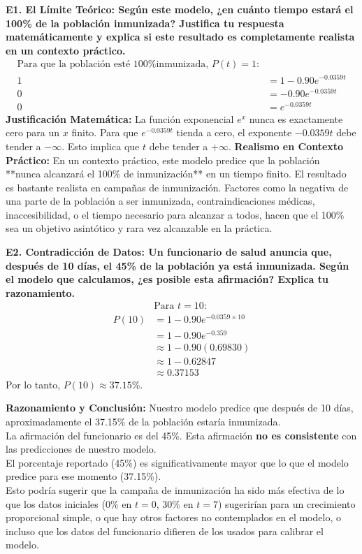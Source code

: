 \documentclass[12pt, a4paper]{article}
\begin{document}
\vspace{0.5em}
\noindent \textbf{E1. El Límite Teórico: Según este modelo, ¿en cuánto tiempo estará el 100\% de la población inmunizada? Justifica tu respuesta matemáticamente y explica si este resultado es completamente realista en un contexto práctico.}
\begin{align*}
\text{Para que la población esté 100\% inmunizada, } P(t) = 1\text{:} \\
1 &= 1 - 0.90e^{-0.0359t} \\
0 &= -0.90e^{-0.0359t} \\
0 &= e^{-0.0359t}
\end{align*}
\textbf{Justificación Matemática:} La función exponencial $e^x$ nunca es exactamente cero para un $x$ finito. Para que $e^{-0.0359t}$ tienda a cero, el exponente $-0.0359t$ debe tender a $-\infty$. Esto implica que $t$ debe tender a $+\infty$.
\textbf{Realismo en Contexto Práctico:} En un contexto práctico, este modelo predice que la población **nunca alcanzará el 100\% de inmunización** en un tiempo finito. El resultado es bastante realista en campañas de inmunización. Factores como la negativa de una parte de la población a ser inmunizada, contraindicaciones médicas, inaccesibilidad, o el tiempo necesario para alcanzar a todos, hacen que el 100\% sea un objetivo asintótico y rara vez alcanzable en la práctica.

\vspace{0.5em}
\noindent \textbf{E2. Contradicción de Datos: Un funcionario de salud anuncia que, después de 10 días, el 45\% de la población ya está inmunizada. Según el modelo que calculamos, ¿es posible esta afirmación? Explica tu razonamiento.}
\begin{align*}
&\text{Para } t=10:\\
P(10) &= 1 - 0.90e^{-0.0359 \times 10} \\
&= 1 - 0.90e^{-0.359} \\
&\approx 1 - 0.90(0.69830) \\
&\approx 1 - 0.62847 \\
&\approx 0.37153
\end{align*}
Por lo tanto, $P(10) \approx 37.15\%$.

\textbf{Razonamiento y Conclusión:} Nuestro modelo predice que después de 10 días, aproximadamente el 37.15\% de la población estaría inmunizada.\\
La afirmación del funcionario es del 45\%. Esta afirmación \textbf{no es consistente} con las predicciones de nuestro modelo.\\
El porcentaje reportado (45\%) es significativamente mayor que lo que el modelo predice para ese momento (37.15\%).\\
Esto podría sugerir que la campaña de inmunización ha sido más efectiva de lo que los datos iniciales (0\% en $t=0$, 30\% en $t=7$) sugerirían para un crecimiento proporcional simple, o que hay otros factores no contemplados en el modelo, o incluso que los datos del funcionario difieren de los usados para calibrar el modelo.
\end{document}

